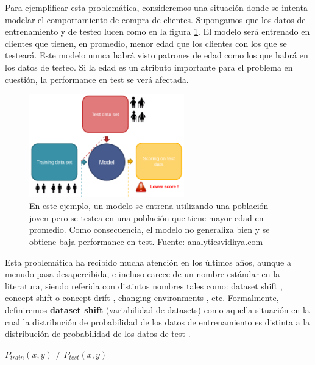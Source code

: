 Para ejemplificar esta problemática, consideremos una situación donde se intenta modelar el comportamiento de compra de clientes. Supongamos que los datos de entrenamiento y de testeo lucen como en la figura \ref{fig:data_shift}. El modelo será entrenado en clientes que tienen, en promedio, menor edad que los clientes con los que se testeará. Este modelo nunca habrá visto patrones de edad como los que habrá en los datos de testeo. Si la edad es un atributo importante para el problema en cuestión, la performance en test se verá afectada. \\


\begin{figure}[h!]
\centering
  \includegraphics[width=0.6\textwidth]{Kap8/data_shift.png}  
\caption{En este ejemplo, un modelo se entrena utilizando una población joven pero se testea en una población que tiene mayor edad en promedio. Como consecuencia, el modelo no generaliza bien y se obtiene baja performance en test. Fuente: \url{analyticsvidhya.com} }
\label{fig:data_shift}
\end{figure}

Esta problemática ha recibido mucha atención en los últimos años, aunque a menudo pasa desapercibida, e incluso carece de un nombre estándar en la literatura, siendo referida con distintos nombres \cite{MORENOTORRES2012521} tales como: dataset shift \cite{quinonero2009dataset}, concept shift o concept drift \cite{widmer1998special} \cite{conceptdrift} , changing environments \cite{changingenvironments}, etc. Formalmente, definiremos \textbf{dataset shift} (variabilidad de datasets) como aquella situación en la cual la distribución de probabilidad de los datos de entrenamiento es distinta a la distribución de probabilidad de los datos de test \cite{quinonero2009dataset} \cite{non-stationary}.

\begin{center}
$ P_{train}(x,y) \neq P_{test}(x,y) $
\end{center}

